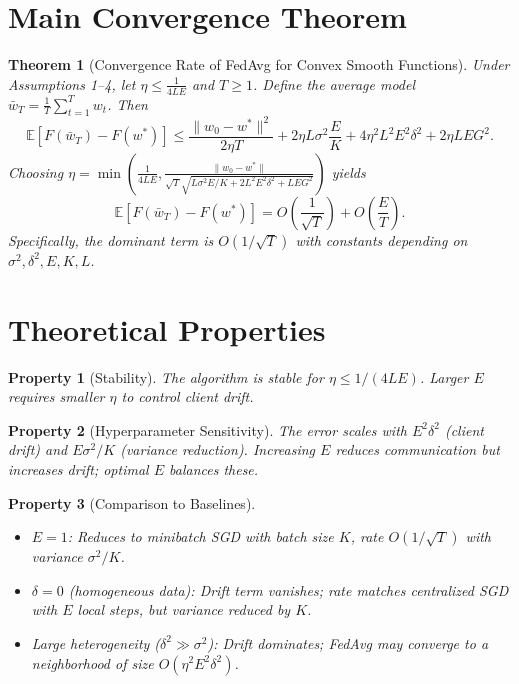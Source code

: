 \documentclass{article}
\newtheorem{theorem}{Theorem}
\newtheorem{property}{Property}
\begin{document}
\section*{Main Convergence Theorem}
\begin{theorem}[Convergence Rate of FedAvg for Convex Smooth Functions]
Under Assumptions 1--4, let $\eta \le \frac{1}{4LE}$ and $T \ge 1$. Define the average model $\bar{w}_T = \frac{1}{T}\sum_{t=1}^T w_t$. Then
\begin{equation}
\mathbb{E}[F(\bar{w}_T) - F(w^*)] \le \frac{\|w_0 - w^*\|^2}{2\eta T} + 2\eta L \sigma^2 \frac{E}{K} + 4\eta^2 L^2 E^2 \delta^2 + 2\eta L E G^2.
\end{equation}
Choosing $\eta = \min\left(\frac{1}{4LE}, \frac{\|w_0 - w^*\|}{\sqrt{T} \sqrt{L\sigma^2 E/K + 2L^2 E^2 \delta^2 + L E G^2}}\right)$ yields
\begin{equation}
\mathbb{E}[F(\bar{w}_T) - F(w^*)] = O\left(\frac{1}{\sqrt{T}}\right) + O\left(\frac{E}{T}\right).
\end{equation}
Specifically, the dominant term is $O(1/\sqrt{T})$ with constants depending on $\sigma^2, \delta^2, E, K, L$.
\end{theorem}

\section*{Theoretical Properties}
\begin{property}[Stability]
The algorithm is stable for $\eta \le 1/(4LE)$. Larger $E$ requires smaller $\eta$ to control client drift.
\end{property}
\begin{property}[Hyperparameter Sensitivity]
The error scales with $E^2\delta^2$ (client drift) and $E\sigma^2/K$ (variance reduction). Increasing $E$ reduces communication but increases drift; optimal $E$ balances these.
\end{property}
\begin{property}[Comparison to Baselines]
\begin{itemize}
    \item $E=1$: Reduces to minibatch SGD with batch size $K$, rate $O(1/\sqrt{T})$ with variance $\sigma^2/K$.
    \item $\delta=0$ (homogeneous data): Drift term vanishes; rate matches centralized SGD with $E$ local steps, but variance reduced by $K$.
    \item Large heterogeneity ($\delta^2 \gg \sigma^2$): Drift dominates; FedAvg may converge to a neighborhood of size $O(\eta^2 E^2 \delta^2)$.
\end{itemize}
\end{property}
\end{document}
